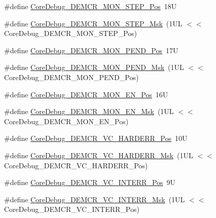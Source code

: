 \begin{DoxyCompactItemize}
\item 
\#define \mbox{\hyperlink{group___c_m_s_i_s___core_debug_ga9ae10710684e14a1a534e785ef390e1b}{Core\+Debug\+\_\+\+D\+E\+M\+C\+R\+\_\+\+M\+O\+N\+\_\+\+S\+T\+E\+P\+\_\+\+Pos}}~18U
\item 
\#define \mbox{\hyperlink{group___c_m_s_i_s___core_debug_ga2ded814556de96fc369de7ae9a7ceb98}{Core\+Debug\+\_\+\+D\+E\+M\+C\+R\+\_\+\+M\+O\+N\+\_\+\+S\+T\+E\+P\+\_\+\+Msk}}~(1\+U\+L $<$$<$ Core\+Debug\+\_\+\+D\+E\+M\+C\+R\+\_\+\+M\+O\+N\+\_\+\+S\+T\+E\+P\+\_\+\+Pos)
\item 
\#define \mbox{\hyperlink{group___c_m_s_i_s___core_debug_ga1e2f706a59e0d8131279af1c7e152f8d}{Core\+Debug\+\_\+\+D\+E\+M\+C\+R\+\_\+\+M\+O\+N\+\_\+\+P\+E\+N\+D\+\_\+\+Pos}}~17U
\item 
\#define \mbox{\hyperlink{group___c_m_s_i_s___core_debug_ga68ec55930269fab78e733dcfa32392f8}{Core\+Debug\+\_\+\+D\+E\+M\+C\+R\+\_\+\+M\+O\+N\+\_\+\+P\+E\+N\+D\+\_\+\+Msk}}~(1\+U\+L $<$$<$ Core\+Debug\+\_\+\+D\+E\+M\+C\+R\+\_\+\+M\+O\+N\+\_\+\+P\+E\+N\+D\+\_\+\+Pos)
\item 
\#define \mbox{\hyperlink{group___c_m_s_i_s___core_debug_ga802829678f6871863ae9ecf60a10425c}{Core\+Debug\+\_\+\+D\+E\+M\+C\+R\+\_\+\+M\+O\+N\+\_\+\+E\+N\+\_\+\+Pos}}~16U
\item 
\#define \mbox{\hyperlink{group___c_m_s_i_s___core_debug_gac2b46b9b65bf8d23027f255fc9641977}{Core\+Debug\+\_\+\+D\+E\+M\+C\+R\+\_\+\+M\+O\+N\+\_\+\+E\+N\+\_\+\+Msk}}~(1\+U\+L $<$$<$ Core\+Debug\+\_\+\+D\+E\+M\+C\+R\+\_\+\+M\+O\+N\+\_\+\+E\+N\+\_\+\+Pos)
\item 
\#define \mbox{\hyperlink{group___c_m_s_i_s___core_debug_gaed9f42053031a9a30cd8054623304c0a}{Core\+Debug\+\_\+\+D\+E\+M\+C\+R\+\_\+\+V\+C\+\_\+\+H\+A\+R\+D\+E\+R\+R\+\_\+\+Pos}}~10U
\item 
\#define \mbox{\hyperlink{group___c_m_s_i_s___core_debug_ga803fc98c5bb85f10f0347b23794847d1}{Core\+Debug\+\_\+\+D\+E\+M\+C\+R\+\_\+\+V\+C\+\_\+\+H\+A\+R\+D\+E\+R\+R\+\_\+\+Msk}}~(1\+U\+L $<$$<$ Core\+Debug\+\_\+\+D\+E\+M\+C\+R\+\_\+\+V\+C\+\_\+\+H\+A\+R\+D\+E\+R\+R\+\_\+\+Pos)
\item 
\#define \mbox{\hyperlink{group___c_m_s_i_s___core_debug_ga22079a6e436f23b90308be97e19cf07e}{Core\+Debug\+\_\+\+D\+E\+M\+C\+R\+\_\+\+V\+C\+\_\+\+I\+N\+T\+E\+R\+R\+\_\+\+Pos}}~9U
\item 
\#define \mbox{\hyperlink{group___c_m_s_i_s___core_debug_gad6815d8e3df302d2f0ff2c2c734ed29a}{Core\+Debug\+\_\+\+D\+E\+M\+C\+R\+\_\+\+V\+C\+\_\+\+I\+N\+T\+E\+R\+R\+\_\+\+Msk}}~(1\+U\+L $<$$<$ Core\+Debug\+\_\+\+D\+E\+M\+C\+R\+\_\+\+V\+C\+\_\+\+I\+N\+T\+E\+R\+R\+\_\+\+Pos)
$$
\end{DoxyCompactItemize}
